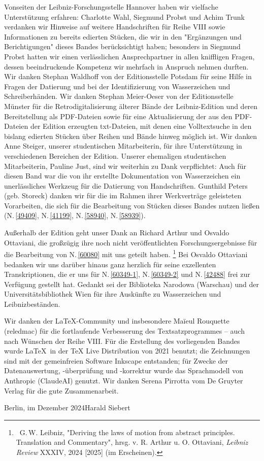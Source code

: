 Vonseiten der Leibniz-Forschungsstelle Hannover haben wir vielfache Unterstützung erfahren: Charlotte Wahl, Siegmund Probst und Achim Trunk verdanken wir Hinweise auf weitere Handschriften für Reihe VIII sowie Informationen zu bereits edierten Stücken, die wir in den "Ergänzungen und Berichtigungen" dieses Bandes berücksichtigt haben; besonders in Siegmund Probst hatten wir einen verlässlichen Ansprechpartner in allen kniffligen Fragen, dessen beeindruckende Kompetenz wir mehrfach in Anspruch nehmen durften. Wir danken Stephan Waldhoff von der Editionsstelle Potsdam für seine Hilfe in Fragen der Datierung und bei der Identifizierung von Wasserzeichen und Schreiberhänden. Wir danken Stephan Meier-Oeser von der Editionsstelle Münster für die Retrodigitalisierung älterer Bände der Leibniz-Edition und deren Bereitstellung als PDF-Dateien sowie für eine Aktualisierung der aus den PDF-Dateien der Edition erzeugten txt-Dateien, mit denen eine Volltextsuche in den bislang edierten Stücken über Reihen und Bände hinweg möglich ist.
Wir danken Anne Steiger, unserer studentischen Mitarbeiterin, für ihre Unterstützung in verschiedenen Bereichen der Edition.
Unserer ehemaligen studentischen Mitarbeiterin, Pauline Just, sind wir weiterhin zu Dank verpflichtet: Auch für diesen Band war die von ihr erstellte Dokumentation von Wasserzeichen ein unerlässliches Werkzeug für die Datierung von Handschriften.
Gunthild Peters (geb. Storeck) danken wir für die im Rahmen ihrer Werkverträge geleisteten Vorarbeiten, die sich für die Bearbeitung von Stücken dieses Bandes nutzen ließen (N.\,\ref{49409}, N.\,\ref{41199}, N.\,\ref{58940}, N.\,\ref{58939}).
\par%
Außerhalb der Edition geht unser Dank an Richard Arthur und Osvaldo Ottaviani, die großzügig ihre noch nicht veröffentlichten Forschungsergebnisse für die Bearbeitung von N.\,\ref{60080} mit uns geteilt haben.%
\footnote{\, G.\,W. Leibniz, "Deriving the laws of motion from abstract principles. Translation and Commentary", hrsg. v. R. Arthur u. O. Ottaviani, \textit{Leibniz Review} XXXIV, 2024 [2025] (im Erscheinen).}
Bei Osvaldo Ottaviani bedanken wir uns darüber hinaus ganz herzlich für seine exzellenten Transkriptionen, die er uns für N.\,\ref{60349-1}, N.\,\ref{60349-2} und N.\,\ref{42488} frei zur Verfügung gestellt hat. Gedankt sei der Biblioteka Narodowa (Warschau) und der Universitätsbibliothek Wien für ihre Auskünfte zu Wasserzeichen und Leibnizbeständen.%
\par%
Wir danken der \LaTeX-Community und insbesondere Maïeul Rouquette (reledmac) für die fortlaufende Verbesserung des Textsatzprogrammes -- auch nach Wünschen der Reihe VIII. Für die Erstellung des vorliegenden Bandes wurde \LaTeX\ in der TeX Live Distribution von 2021 benutzt; die Zeichnungen sind mit der gemeinfreien Software Inkscape entstanden; für Zwecke der Datenauswertung, -überprüfung und -korrektur wurde das Sprachmodell von Anthropic (ClaudeAI) genutzt. %
Wir danken Serena Pirrotta vom De Gruyter Verlag für die gute Zusammenarbeit.
\par%
\vspace{2em}
Berlin, im Dezember 2024\hspace{65mm}Harald Siebert
